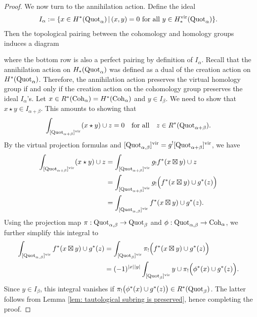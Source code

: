 \documentclass[10pt]{amsart}
\newcommand{\BQ}{\mathbb{Q}}
\newcommand{\Quot}{\textnormal{Quot}}
\newcommand{\Coh}{\textnormal{Coh}}
\newcommand{\+}{{}^+}
\newcommand{\vir}{\textnormal{vir}}
\theoremstyle{definition}
\theoremstyle {definition}
\theoremstyle {definition}
\begin{document}
\begin{proof}
We now turn to the annihilation action. Define the ideal
$$I_\alpha:=\{x\in H^*(\Quot_\alpha)\,|\,(x,y)=0\textnormal{ for all }y\in H^\vir_*(\Quot_\alpha)\}. 
$$
Then the topological pairing between the cohomology and homology groups induces a diagram 
\begin{center}
\end{center}
where the bottom row is also a perfect pairing by definition of $I_\alpha$. Recall that the annihilation action on $H_*(\Quot_\alpha)$ was defined as a dual of the creation action on $H^*(\Quot_\alpha)$. Therefore, the annihilation action preserves the virtual homology group if and only if the creation action on the cohomology group preserves the ideal $I_\alpha$'s. Let $x\in R^*(\Coh_\alpha)=H^*(\Coh_\alpha)$ and $y\in I_\beta$. We need to show that $x\star y\in I_{\alpha+\beta}$. This amounts to showing that
$$\int_{[\Quot_{\alpha+\beta}]^\vir}(x\star y)\cup z=0\quad\textnormal{for all}\quad z\in R^*(\Quot_{\alpha+\beta}). 
$$
By the virtual projection formulas and $[\Quot_{\alpha,\beta}]^\vir=g^![\Quot_{\alpha+\beta}]^\vir$, we have
\begin{align*}
    \int_{[\Quot_{\alpha+\beta}]^\vir}(x\star y)\cup z
    &=\int_{[\Quot_{\alpha+\beta}]^\vir}g_! f^*(x\boxtimes y) \cup z\\
    &=\int_{[\Quot_{\alpha+\beta}]^\vir}g_! \Big(f^*(x\boxtimes y) \cup g^*(z)\Big)\\
    &=\int_{[\Quot_{\alpha,\beta}]^\vir}f^*(x\boxtimes y) \cup g^*(z).
\end{align*}
Using the projection map $\pi:\Quot_{\alpha,\beta}\rightarrow \Quot_\beta$ and $\phi:\Quot_{\alpha,\beta}\rightarrow \Coh_\alpha$, we further simplify this integral to
\begin{align*}
    \int_{[\Quot_{\alpha,\beta}]^\vir}f^*(x\boxtimes y) \cup g^*(z)
    &=\int_{[\Quot_\beta]^\vir}\pi_!\Big(f^*(x\boxtimes y) \cup g^*(z)\Big)\\
    &=(-1)^{|x||y|}\int_{[\Quot_\beta]^\vir}y\cup \pi_!\Big(\phi^*(x) \cup g^*(z)\Big).
\end{align*}
Since $y\in I_{\beta}$, this integral vanishes if $\pi_!\big(\phi^*(x) \cup g^*(z)\big)\in R^*(\Quot_\beta)$. The latter follows from Lemma \ref{lem: tautological subring is preserved}, hence completing the proof. 
\end{proof}
\end{document}
